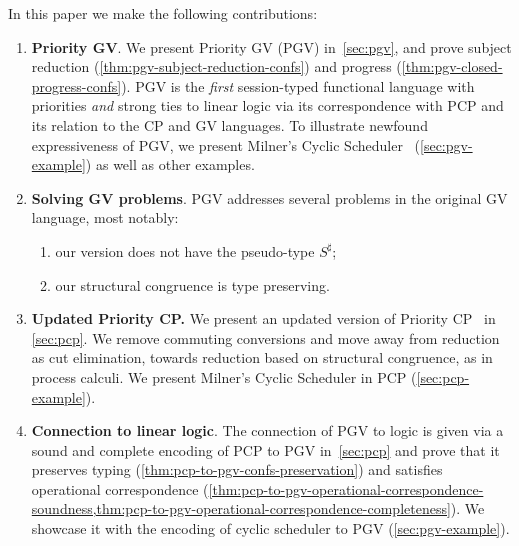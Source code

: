 \documentclass[main.tex]{subfiles}
\begin{document}
In this paper we make the following contributions:
\begin{enumerate}
\item
\textbf{Priority GV}. We present Priority GV (PGV) in~\cref{sec:pgv}, and prove subject reduction (\cref{thm:pgv-subject-reduction-confs}) and progress (\cref{thm:pgv-closed-progress-confs}).
PGV is the \emph{first} session-typed functional language with priorities \emph{and} strong ties to linear logic via its correspondence with PCP and its relation to the CP and GV languages.
To illustrate newfound expressiveness of PGV, we present Milner's Cyclic Scheduler~\cite{milner89} (\cref{sec:pgv-example}) as well as other examples.


 \item
 \textbf{Solving GV problems}. PGV addresses several problems in the original GV language, most notably:
 	\begin{enumerate}
	\item our version does not have the pseudo-type $S^\sharp$;
	\item our structural congruence is type preserving.
	\end{enumerate}
\item
\textbf{Updated Priority CP.} We present an updated version of Priority CP~\cite{dardhagay18} in \cref{sec:pcp}. We remove commuting conversions and move away from reduction as cut elimination, towards reduction based on structural congruence, as in process calculi. We present Milner's Cyclic Scheduler in PCP (\cref{sec:pcp-example}).

\item
\textbf{Connection to linear logic}. The connection of PGV to logic is given via a sound and complete encoding of PCP to PGV in~\cref{sec:pcp} and prove that it preserves typing (\cref{thm:pcp-to-pgv-confs-preservation}) and satisfies operational correspondence (\cref{thm:pcp-to-pgv-operational-correspondence-soundness,thm:pcp-to-pgv-operational-correspondence-completeness}).  We showcase it with the encoding of cyclic scheduler to PGV (\cref{sec:pgv-example}).
\end{enumerate}
\end{document}
